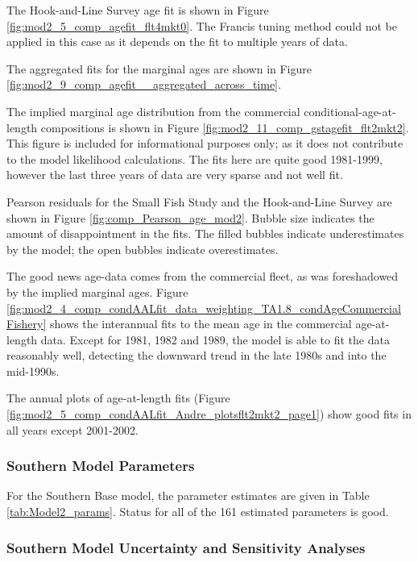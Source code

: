 \documentclass[12pt,]{article}
\begin{document}
The Hook-and-Line Survey age fit is shown in Figure
\ref{fig:mod2_5_comp_agefit_flt4mkt0}. The Francis tuning method could
not be applied in this case as it depends on the fit to multiple years
of data.

The aggregated fits for the marginal ages are shown in Figure
\ref{fig:mod2_9_comp_agefit__aggregated_across_time}.

The implied marginal age distribution from the commercial
conditional-age-at-length compositions is shown in Figure
\ref{fig:mod2_11_comp_gstagefit_flt2mkt2}. This figure is included for
informational purposes only; as it does not contribute to the model
likelihood calculations. The fits here are quite good 1981-1999, however
the last three years of data are very sparse and not well fit.

Pearson residuals for the Small Fish Study and the Hook-and-Line Survey
are shown in Figure \ref{fig:comp_Pearson_age_mod2}. Bubble size
indicates the amount of disappointment in the fits. The filled bubbles
indicate underestimates by the model; the open bubbles indicate
overestimates.

The good news age-data comes from the commercial fleet, as was
foreshadowed by the implied marginal ages. Figure
\ref{fig:mod2_4_comp_condAALfit_data_weighting_TA1.8_condAgeCommercial Fishery}
shows the interannual fits to the mean age in the commercial
age-at-length data. Except for 1981, 1982 and 1989, the model is able to
fit the data reasonably well, detecting the downward trend in the late
1980s and into the mid-1990s.

The annual plots of age-at-length fits (Figure
\ref{fig:mod2_5_comp_condAALfit_Andre_plotsflt2mkt2_page1}) show good
fits in all years except 2001-2002.

\subsubsection{Southern Model
Parameters}\label{southern-model-parameters}

For the Southern Base model, the parameter estimates are given in Table
\ref{tab:Model2_params}. Status for all of the 161 estimated parameters
is good.

\subsubsection{Southern Model Uncertainty and Sensitivity
Analyses}\label{southern-model-uncertainty-and-sensitivity-analyses}
\end{document}
